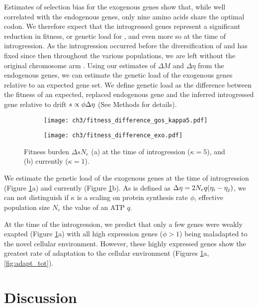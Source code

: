 Estimates of selection bias for the exogenous genes show that, while well correlated with the endogenous genes, only nine amino acids share the optimal codon.
We therefore expect that the introgressed genes represent a significant reduction in fitness, or genetic load for \kluyveri, and even more so at the time of introgression.
As the introgression occurred before the diversification of \kluyveri and has fixed since then throughout the various populations, we are left without the original chromosome arm \citep{friedrich2015}.
Using our estimates of $\Delta M$ and $\Delta \eta$ from the endogenous genes, we can estimate the genetic load of the exogenous genes relative to an expected gene set.
We define genetic load as the difference between the fitness of an expected, replaced endogenous gene and the inferred introgressed gene relative to drift $s \propto \phi {\Delta \eta}$ (See Methods for details).
\begin{figure}[h]
    \centering
    \begin{subfigure}
        \centering
        \texttt{[image: ch3/fitness\_difference\_gos\_kappa5.pdf]}
    \end{subfigure}
    \begin{subfigure}
        \centering
        \texttt{[image: ch3/fitness\_difference\_exo.pdf]}
    \end{subfigure}
    \caption{Fitness burden $\Delta sN_e$ (a) at the time of introgression ($\kappa = 5$), and (b) currently ($\kappa = 1$). }
    \label{fig:sne_fitness_burden}
\end{figure}

We estimate the genetic load of the exogenous genes at the time of introgression (Figure \ref{fig:sne_fitness_burden}a) and currently (Figure \ref{fig:sne_fitness_burden}b).
As \DE is defined as ${\Delta \eta} = 2N_eq(\eta_i-\eta_j)$, we can not distinguish if $\kappa$ is a scaling on protein synthesis rate $\phi$, effective population size $N_e$ the value of an ATP $q$\citep{gilchrist2015}.

At the time of the introgression, we predict that only a few genes were weakly exapted (Figure \ref{fig:sne_fitness_burden}a) with all high expression genes ($\phi > 1$) being maladapted to the novel cellular environment.
However, these highly expressed genes show the greatest rate of adaptation to the \kluyveri cellular environment (Figures \ref{fig:sne_fitness_burden}a, \ref{fig:adapt_tot}).

\section{Discussion}


